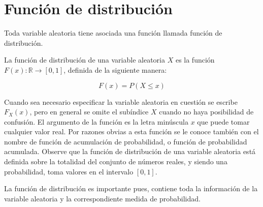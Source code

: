 \pagebreak

\section{Función de distribución}

Toda variable aleatoria tiene asociada una función llamada función de
distribución.

\begin{tcolorbox}[colback=gray!5!white,colframe=gray!60!black,title=Definición: Función de Distribución]

    La función de distribución de una variable aleatoria $X$ es la función 
    $F(x): \mathbb{R} \rightarrow [0,1]$, definida de la siguiente manera:

\begin{equation}
    F(x) = P(X \leq x)
\end{equation}

\end{tcolorbox}


Cuando sea necesario especificar la variable aleatoria en cuestión se escribe
$F_X (x)$, pero en general se omite el subíndice $X$ cuando no haya posibilidad
de confusión. El argumento de la función es la letra minúscula $x$ que puede
tomar cualquier valor real. Por razones obvias a esta función se le conoce
también con el nombre de función de acumulación de probabilidad, o función de
probabilidad acumulada. Observe que la función de distribución de una variable
aleatoria está definida sobre la totalidad del conjunto de números reales, y
siendo una probabilidad, toma valores en el intervalo $[0, 1]$.


La función de distribución es importante pues, contiene toda la información de
la variable aleatoria y la correspondiente medida de probabilidad.

